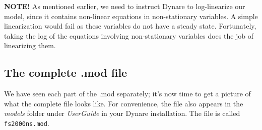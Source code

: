 \textsf{\textbf{NOTE!}} As mentioned earlier, we need to instruct Dynare to log-linearize our model, since it contains non-linear equations in non-stationary variables. A simple linearization would fail as these variables do not have a steady state. Fortunately, taking the log of the equations involving non-stationary variables does the job of linearizing them.\\

\subsection{The complete .mod file}
We have seen each part of the .mod separately; it's now time to get a picture of what the complete file looks like. For convenience, the file also appears in the \textsl{models} folder under \textsl{UserGuide} in your Dynare installation. The file is called \texttt{fs2000ns.mod}. \\
\\
